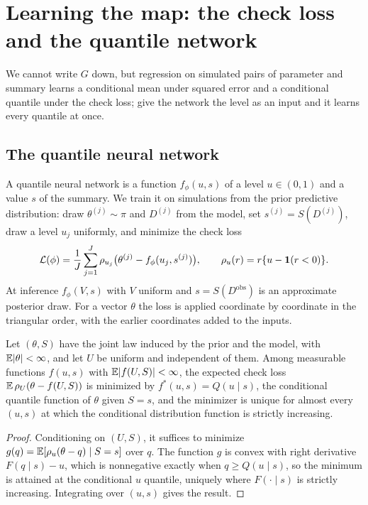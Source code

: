 \section{Learning the map: the check loss and the quantile network}\label{gbc:sec:qnn}\label{comp:sec:network}

We cannot write $G$ down, but regression on simulated pairs of parameter and summary learns a conditional mean under squared error and a conditional quantile under the check loss; give the network the level as an input and it learns every quantile at once.

\subsection{The quantile neural network}

A quantile neural network is a function $f_\phi(u,s)$ of a level $u\in(0,1)$ and a value $s$ of the summary. We train it on simulations from the prior predictive distribution: draw $\theta^{(j)}\sim\pi$ and $D^{(j)}$ from the model, set $s^{(j)}=S(D^{(j)})$, draw a level $u_j$ uniformly, and minimize the check loss
\begin{equation}\label{gbc:eq:pinball}
\mathcal L(\phi) = \frac1J\sum_{j=1}^J \rho_{u_j}\bigl(\theta^{(j)} - f_\phi(u_j, s^{(j)})\bigr),\qquad \rho_u(r) = r\{u - \mathbf{1}(r<0)\}.
\end{equation}
At inference $f_\phi(V,s)$ with $V$ uniform and $s=S(D^{\mathrm{obs}})$ is an approximate posterior draw. For a vector $\theta$ the loss is applied coordinate by coordinate in the triangular order, with the earlier coordinates added to the inputs.

\begin{proposition}\label{gbc:prop:pinball}
Let $(\theta, S)$ have the joint law induced by the prior and the model, with $\mathbb{E}\lvert\theta\rvert<\infty$, and let $U$ be uniform and independent of them. Among measurable functions $f(u,s)$ with $\mathbb{E}\lvert f(U,S)\rvert<\infty$, the expected check loss $\mathbb{E}\,\rho_U(\theta - f(U,S))$ is minimized by $f^\ast(u,s) = Q(u\mid s)$, the conditional quantile function of $\theta$ given $S=s$, and the minimizer is unique for almost every $(u,s)$ at which the conditional distribution function is strictly increasing.
\end{proposition}
\begin{proof}
Conditioning on $(U,S)$, it suffices to minimize $g(q) = \mathbb{E}[\rho_u(\theta - q)\mid S=s]$ over $q$. The function $g$ is convex with right derivative $F(q\mid s) - u$, which is nonnegative exactly when $q\ge Q(u\mid s)$, so the minimum is attained at the conditional $u$ quantile, uniquely where $F(\cdot\mid s)$ is strictly increasing. Integrating over $(u,s)$ gives the result.
\end{proof}

